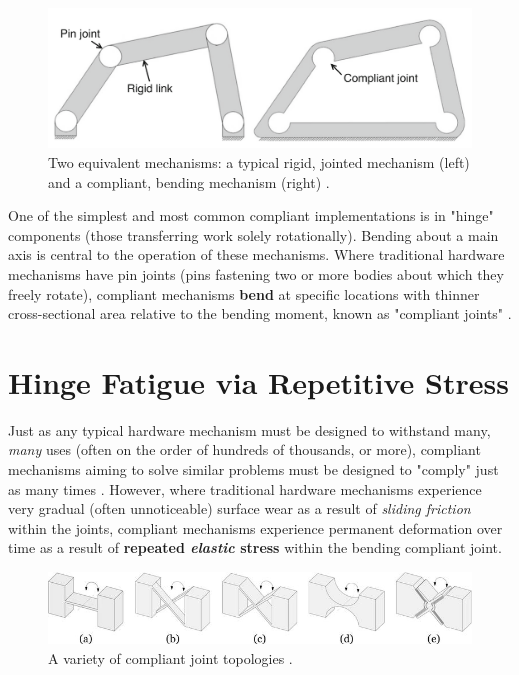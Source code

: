\documentclass{report}
\begin{document}
\begin{figure}[h]
    \label{fig:wrench}
    \centering
    \includegraphics[width=\textwidth]{images/comparison.png}
    \hfill
    \caption{Two equivalent mechanisms: a typical rigid, jointed mechanism (left) and a 
    compliant, bending mechanism (right) \cite{functionallygradedmaterials}.}
\end{figure}

One of the simplest and most common compliant implementations is in "hinge" components (those 
transferring work solely rotationally). Bending about a main axis is central to the operation 
of these mechanisms. Where traditional hardware mechanisms have pin joints (pins fastening two 
or more bodies about which they freely rotate), compliant mechanisms \textbf{bend} at specific 
locations with thinner cross-sectional area relative to the bending moment, known as "compliant
joints" \cite{compliant}. 

\pagebreak
\section{Hinge Fatigue via Repetitive Stress}

Just as any typical hardware mechanism must be designed to withstand many, \textit{many} uses 
(often on the order of hundreds of thousands, or more), compliant mechanisms aiming to solve 
similar problems must be designed to "comply" just as many times \cite{rotationalhinges}. 
However, where traditional hardware mechanisms experience very gradual (often unnoticeable) 
surface wear as a result of \textit{sliding friction} within the joints, compliant mechanisms 
experience permanent deformation over time as a result of \textbf{repeated \textit{elastic} 
stress} within the bending compliant joint. 
\vspace{1cm}
\begin{figure}[h]
    \centering
    \includegraphics[width=\textwidth]{images/hingetypes.png}
    \hfill
    \caption{A variety of compliant joint topologies \cite{hingedesign}.}
\end{figure}
\end{document}
